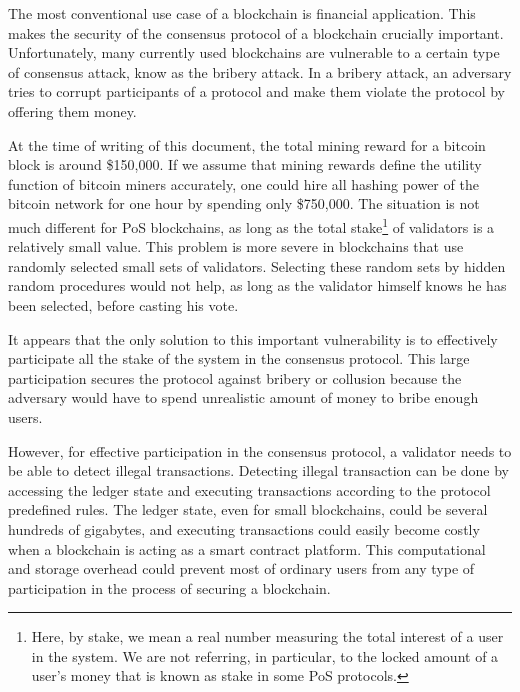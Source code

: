 The most conventional use case of a blockchain is financial application. This makes the security of the consensus
protocol of a blockchain crucially important. Unfortunately, many currently used blockchains are vulnerable to a
certain type
of consensus attack, know as the bribery attack. In a bribery attack, an adversary tries to corrupt participants of a
protocol and make them violate the protocol by offering them money.

At the time of writing of this document,
the total mining reward for a bitcoin block is around \$150,000. If we assume that mining rewards define the utility
function of bitcoin miners accurately, one could hire all hashing power of the bitcoin network for one hour by spending
only \$750,000. The situation is not much different for PoS blockchains, as long as the total stake\footnote{Here, by
stake, we mean a real number measuring the total interest of a user in the system. We are not referring, in
particular, to the locked amount of a user's money that is known as stake in some PoS protocols.}
of validators is a relatively small value. This problem is more severe in blockchains that use randomly selected small
sets of validators. Selecting these random sets by hidden random procedures would not help, as long as the
validator himself knows he has been selected, before casting his vote.

It appears that the only solution to this important vulnerability is to effectively participate all the stake of the
system in the consensus protocol. This large participation secures the protocol against bribery or
collusion because the adversary would have to spend unrealistic amount of money to bribe enough users.

However, for effective participation in the consensus protocol, a validator needs to be able to detect
illegal transactions. Detecting illegal transaction can be done by accessing the ledger
state and executing transactions according to the protocol predefined rules. The
ledger state, even for small blockchains, could be several
hundreds of gigabytes, and executing transactions could easily become costly when a blockchain is acting as a
smart contract platform. This computational and storage overhead could prevent most of
ordinary users from any type of participation in the process of securing a blockchain.

